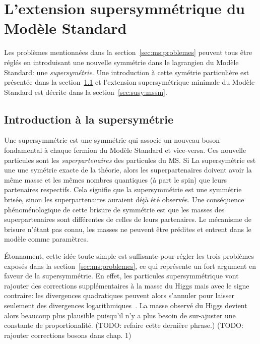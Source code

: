 \singlespacing{}
\chapter{L'extension supersymmétrique du Modèle Standard}
\label{sec:susy}
\doublespacing{}

Les problèmes mentionnées dans la section~\ref{sec:ms:problemes}
peuvent tous être réglés en introduisant une nouvelle symmétrie dans
le lagrangien du Modèle Standard: une \emph{supersymétrie}. Une
introduction à cette symétrie particulière est présentée dans la
section~\ref{sec:susy:th} et l'extension supersymétrique minimale du
Modèle Standard est décrite dans la section~\ref{sec:susy:mssm}.

\section{Introduction à la supersymétrie}
\label{sec:susy:th}

Une supersymmétrie est une symmétrie qui associe un nouveau boson
fondamental à chaque fermion du Modèle Standard et vice-versa. Ces
nouvelle particules sont les \emph{superpartenaires} des particules du
MS. Si La supersymétrie est une une symétrie exacte de la théorie,
alors les superpartenaires doivent avoir la même masse et les mêmes
nombres quantiques (à part le spin) que leurs partenaires
respectifs. Cela signifie que la supersymmétrie est une symmétrie
brisée, sinon les superpartenaires auraient déjà été observés. Une
conséquence phénoménologique de cette brisure de symmétrie est que les
masses des superpartenaires sont différentes de celles de leurs
partenaires. Le mécanisme de brisure n'étant pas connu, les masses ne
peuvent être prédites et entrent dans le modèle comme paramètres.

Étonnament, cette idée toute simple est suffisante pour régler les
trois problèmes exposés dans la section~\ref{sec:ms:problemes}, ce qui
représente un fort argument en faveur de la supersymmétrie. En effet,
les particules supersymmétrique vont rajouter des corrections
supplémentaires à la masse du Higgs mais avec le signe contraire: les
divergences quadratiques peuvent alors s'annuler pour laisser
seulement des divergences
logarithmiques~\cite{martin_supersymmetry_1997}. La masse observé du
Higgs devient alors beaucoup plus plausible puisqu'il n'y a plus
besoin de sur-ajuster une constante de proportionalité. (TODO: refaire
cette dernière phrase.) (TODO:  rajouter corrections bosons dans chap. 1)




